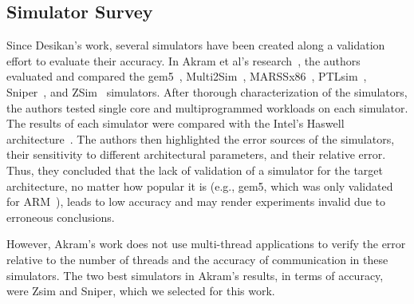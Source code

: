 \documentclass[AMA,final,STIX1COL]{WileyNJD-v2}
\newcommand{\ms}[1]{\textcolor{orange}{\bfseries \ul{ msserpa: #1} }\vspace{0.2cm}}
\newcommand{\fbm}[1]{\textcolor{red}{\bfseries \ul{fbm: #1} }\vspace{0.2cm}}
\begin{document}
\subsection{Simulator Survey} 

Since Desikan's work, several simulators have been created along a validation effort to evaluate their accuracy.
In Akram et al's research~\cite{akram2019survey}, the authors evaluated and compared the gem5~\cite{binkert2011gem5}, Multi2Sim~\cite{ubal2012multi2sim}, MARSSx86~\cite{patel2011marss}, PTLsim~\cite{yourst2007ptlsim}, Sniper~\cite{carlson2014aeohmcm}, and ZSim~\cite{sanchez2013zsim} simulators. 
After thorough characterization of the simulators, the authors tested single core and multiprogrammed workloads on each simulator. 
The results of each simulator were compared with the Intel's Haswell architecture~\cite{hammarlund2014haswell}. 
The authors then highlighted the error sources of the simulators, their sensitivity to different architectural parameters, and their relative error. 
Thus, they concluded that the lack of validation of a simulator for the target architecture, no matter how popular it is (e.g., gem5, which was only validated for ARM~\cite{gutierrez2014sources}), leads to low accuracy and may render experiments invalid due to erroneous conclusions.

However, Akram's work does not use multi-thread applications to verify the error relative to the number of threads and the accuracy of communication in these simulators.
The two best simulators in Akram's results, in terms of accuracy, were Zsim and Sniper, which we selected for this work.




\end{document}

